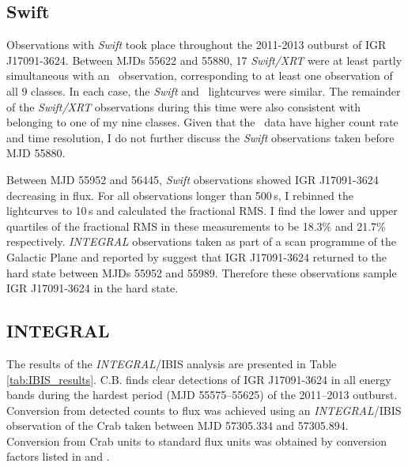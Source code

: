 \subsection{Swift}

\par Observations with \indexswift\textit{Swift} took place throughout the 2011-2013 outburst of IGR J17091-3624.  Between MJDs 55622 and 55880, 17 \indexxrt\textit{Swift/XRT} were at least partly simultaneous with an \rxte\indexrxte\ observation, corresponding to at least one observation of all 9 classes.  In each case, the \textit{Swift} and \rxte\ lightcurves were similar.  The remainder of the \textit{Swift/XRT} observations during this time were also consistent with belonging to one of my nine classes.  Given that the \rxte\ data have higher count rate and time resolution, I do not further discuss the \textit{Swift} observations taken before MJD 55880.
\par Between MJD 55952 and 56445, \indexswift\textit{Swift} observations showed IGR J17091-3624 decreasing in flux.  For all observations longer than 500\,s, I rebinned the lightcurves to 10\,s and calculated the fractional RMS.  I find the lower and upper quartiles of the fractional RMS in these measurements to be 18.3\% and 21.7\% respectively.  \textit{INTEGRAL} observations taken as part of a scan programme of the Galactic Plane \citep{Fiocchi_PlaneScan} and reported by \citet{Drave_Return} suggest that IGR J17091-3624 returned to the hard state between MJDs 55952 and 55989.  Therefore these observations sample IGR J17091-3624 in the hard state.

\subsection{INTEGRAL}

\par The results of the \indexintegral\indexibis\textit{INTEGRAL}/IBIS analysis are presented in Table \ref{tab:IBIS_results}. \textsf{C.B.} finds clear detections of IGR J17091-3624 in all energy bands during the hardest period (MJD 55575--55625) of the 2011--2013 outburst. Conversion from detected counts to flux was achieved using an \textit{INTEGRAL}/IBIS observation of the Crab taken between MJD 57305.334 and 57305.894. Conversion from Crab units to standard flux units was obtained by conversion factors listed in \citet{Bird_Survey} and \citet{Bazzano_Survey}.


